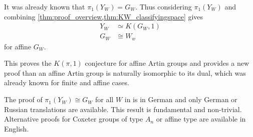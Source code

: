 \documentclass[class=guthesis, crop=false]{standalone}
\begin{document}
It was already known \cite{brieskorn_fundamentalgruppe_1971} that $\pi_1(Y_W) = G_W$. Thus considering $\pi_1(Y_W)$ and combining \cref{thm:proof_overview,thm:KW_classifyingspace} gives
\begin{align*}
	Y_W &\simeq K(G_W,1)\\
	G_W &\cong W_w
	\label{eq:artin_iso_dual}
\end{align*}
for affine $G_W$.

This proves the $K(\pi, 1)$ conjecture for affine Artin groups and provides a new proof than an affine Artin group is naturally isomorphic to its dual, which was already known for finite \cite{bessis_dual_2003} and affine \cite{mccammond_sulway_artin_2017} cases.

The proof of $\pi_1(Y_W) \cong G_W$ for all $W$ in \cite{brieskorn_fundamentalgruppe_1971} is in German and only German or Russian translations are available. This result is fundamental and non-trivial. Alternative proofs for Coxeter groups of type $A_n$ \cite{fox_neuwirth_braid_1962} or affine type \cite{vietdung_fundamental_1983} are available in English.
\end{document}
